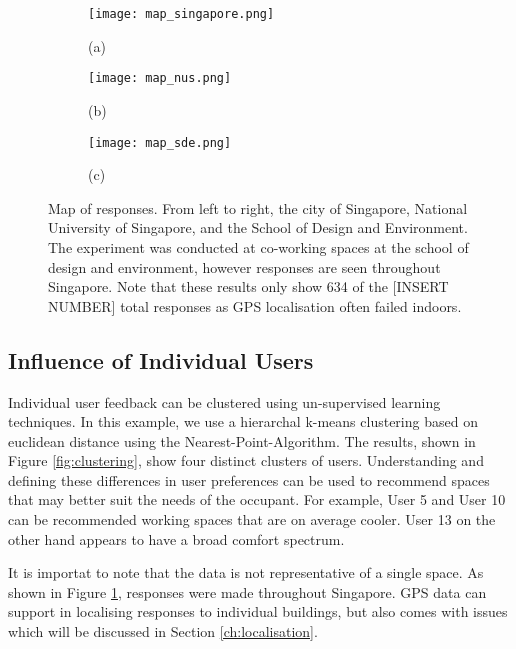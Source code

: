 \begin{figure}
    \centering
    \begin{subfigure}[t]{0.3\textwidth}
        \centering
        \texttt{[image: map\_singapore.png]}
        \caption{(a)}
    \end{subfigure}
    \begin{subfigure}[t]{0.3\textwidth}
        \centering
        \texttt{[image: map\_nus.png]}
        \caption{(b)}
    \end{subfigure}
    \begin{subfigure}[t]{0.3\textwidth}
        \centering
        \texttt{[image: map\_sde.png]}
        \caption{(c)}
    \end{subfigure}
    \caption{Map of responses. From left to right, the city of Singapore, National University of Singapore, and the School of Design and Environment. The experiment was conducted at co-working spaces at the school of design and environment, however responses are seen throughout Singapore. Note that these results only show 634 of the [INSERT NUMBER] total responses as GPS localisation often failed indoors.}
    \label{fig:map}
\end{figure}


\subsection{Influence of Individual Users}
\label{ch:userResults}

Individual user feedback can be clustered using un-supervised learning techniques. In this example, we use a hierarchal k-means clustering based on euclidean distance using the Nearest-Point-Algorithm. The results, shown in Figure \ref{fig:clustering}, show four distinct clusters of users. 
Understanding and defining these differences in user preferences can be used to recommend spaces that may better suit the needs of the occupant. For example, User 5 and User 10 can be recommended working spaces that are on average cooler. User 13 on the other hand appears to have a broad comfort spectrum. 

It is importat to note that the data is not representative of a single space. As shown in Figure \ref{fig:map}, responses were made throughout Singapore. GPS data can support in localising responses to individual buildings, but also comes with issues which will be discussed in Section \ref{ch:localisation}.


